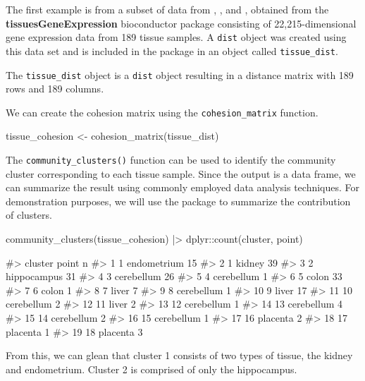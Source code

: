 The first example is from a subset of data from \citet{zilliox2007gene},
\citet{mccall2011gene}, and \citet{mccall2014gene}, obtained from the
\textbf{tissuesGeneExpression} bioconductor package \citep{tissue}
consisting of 22,215-dimensional gene expression data from 189 tissue
samples. A \texttt{dist} object was created using this data set and is
included in the  package in an object called
\texttt{tissue\_dist}.

The \texttt{tissue\_dist} object is a \texttt{dist} object resulting in
a distance matrix with 189 rows and 189 columns.

We can create the cohesion matrix using the \texttt{cohesion\_matrix}
function.

\begin{Schunk}
\begin{Sinput}
tissue_cohesion <- cohesion_matrix(tissue_dist)
\end{Sinput}
\end{Schunk}

The \texttt{community\_clusters()} function can be used to identify the
community cluster corresponding to each tissue sample. Since the output
is a data frame, we can summarize the result using commonly employed
data analysis techniques. For demonstration purposes, we will use the
 package to summarize the contribution of clusters.

\begin{Schunk}
\begin{Sinput}
community_clusters(tissue_cohesion) |>
  dplyr::count(cluster, point)
\end{Sinput}
\begin{Soutput}
#>    cluster       point  n
#> 1        1 endometrium 15
#> 2        1      kidney 39
#> 3        2 hippocampus 31
#> 4        3  cerebellum 26
#> 5        4  cerebellum  1
#> 6        5       colon 33
#> 7        6       colon  1
#> 8        7       liver  7
#> 9        8  cerebellum  1
#> 10       9       liver 17
#> 11      10  cerebellum  2
#> 12      11       liver  2
#> 13      12  cerebellum  1
#> 14      13  cerebellum  4
#> 15      14  cerebellum  2
#> 16      15  cerebellum  1
#> 17      16    placenta  2
#> 18      17    placenta  1
#> 19      18    placenta  3
\end{Soutput}
\end{Schunk}

From this, we can glean that cluster 1 consists of two types of tissue,
the kidney and endometrium. Cluster 2 is comprised of only the
hippocampus.


